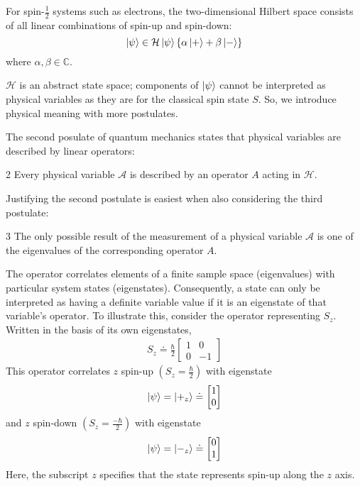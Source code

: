 For spin-$\frac{1}{2}$ systems such as electrons, the two-dimensional Hilbert space consists of all linear combinations of spin-up and spin-down:
\begin{equation}
  \ket{\psi} \in \mathcal{H} \\ \nonumber
  \ket{\psi}\{\alpha\ket{+} + \beta\ket{-}\}
\end{equation}
where $\alpha, \beta \in \mathbb{C}$.

$\mathcal{H}$ is an abstract state space; components of $\ket{\psi}$ cannot be interpreted as physical variables as they are for the classical spin state $S$. So, we introduce physical meaning with more postulates.

The second posulate of quantum mechanics states that physical variables are described by linear operators:
\begin{Thm:Postulate}{2}
    Every physical variable $\mathcal{A}$ is described by an operator $A$ acting in $\mathcal{H}$.
\end{Thm:Postulate}

Justifying the second postulate is easiest when also considering the third postulate:
\begin{Thm:Postulate}{3}
    The only possible result of the measurement of a physical variable $\mathcal{A}$ is one of the eigenvalues of the corresponding operator $A$.
\end{Thm:Postulate}

The operator correlates elements of a finite sample space (eigenvalues) with particular system states (eigenstates). Consequently, a state can only be interpreted as having a definite variable value if it is an eigenstate of that variable's operator. To illustrate this, consider the operator representing $S_z$. Written in the basis of its own eigenstates,
\begin{align}
    S_z \doteq \frac{\hbar}{2}\begin{bmatrix} 1 & 0 \\ 0 & -1 \end{bmatrix}
\end{align}
This operator correlates $z$ spin-up $\left(S_z = \frac{\hbar}{2}\right)$ with eigenstate
\begin{align}
    \ket{\psi} = \ket{+_z} \doteq \begin{bmatrix} 1 \\ 0 \end{bmatrix}
\end{align}
and $z$ spin-down $\left(S_z = \frac{-\hbar}{2}\right)$ with eigenstate
\begin{align}
    \ket{\psi} = \ket{-_z} \doteq \begin{bmatrix} 0 \\ 1 \end{bmatrix}
\end{align}
Here, the subscript $z$ specifies that the state represents spin-up along the $z$ axis.

